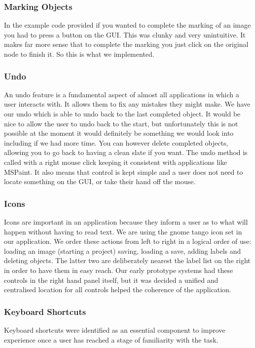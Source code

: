 \documentclass[a4paper,11pt,oneside]{article}
\begin{document}
\subsubsection{Marking Objects}
In the example code provided if you wanted to complete the marking of an image
you had to press a button on the GUI.  This was clunky and very unintuitive.  It
makes far more sense that to complete the marking you just click on the original
node to finish it.  So this is what we implemented.

\subsubsection{Undo}
An undo feature is a fundamental aspect of almost all applications in which
a user interacts with.  It allows them to fix any mistakes they might make.  We
have our undo which is able to undo back to the last completed object.  It would
be nice to allow the user to undo back to the start, but unfortunately this is
not possible at the moment it would definitely be something we would look into 
including if we had more time.  You can however delete completed objects, 
allowing you to go back to having a clean slate if you want.  The undo method
is called with a right mouse click keeping it consistent with applications like
MSPaint.  It also means that control is kept simple and a user does not need
to locate something on the GUI, or take their hand off the mouse.

\subsubsection{Icons}
Icons are important in an application because they inform a user as to what will
happen without having to read text.  We are using the gnome tango icon set in
our application.  We order these actions from left to right in a logical order
of use: loading an image (starting a project) saving, loading a save, adding
labels and deleting objects. The latter two are deliberately nearest the label
list on the right in order to have them in easy reach. Our early prototype
systems had these controls in the right hand panel itself, but it was decided a
unified and centralised location for all controls helped the coherence of the
application.
\subsubsection{Keyboard Shortcuts}
Keyboard shortcuts were identified as an essential component to improve
experience once a user has reached a stage of familiarity with the task.
\end{document}

